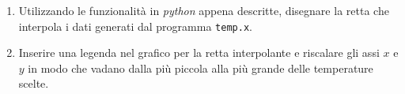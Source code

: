 \documentclass[11pt]{article}
\begin{document}

\begin{enumerate}
  \item Utilizzando le funzionalit\`a in {\it python\/} appena descritte, disegnare la retta che interpola i dati generati dal programma \texttt{temp.x}.
\item 
  Inserire una legenda nel grafico per la retta interpolante e riscalare gli assi $x$ e $y$ in modo che vadano dalla pi\`u piccola alla pi\`u grande delle temperature scelte. 
\end{enumerate}  
\end{document}
